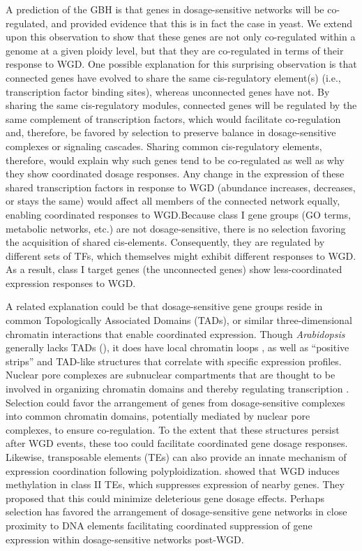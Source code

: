 \documentclass[11pt]{article}
\begin{document}
A prediction of the GBH is that genes in dosage-sensitive networks will be co-regulated, and \cite{papp2003} provided evidence that this is in fact the case in yeast. We extend upon this observation to show that these genes are not only co-regulated within a genome at a given ploidy level, but that they are co-regulated in terms of their response to WGD. 
One possible explanation for this surprising observation is that connected genes have evolved to share the same cis-regulatory element(s) (i.e., transcription factor binding sites), whereas unconnected genes have not. By sharing the same cis-regulatory modules, connected genes will be regulated by the same complement of transcription factors, which would facilitate co-regulation and, therefore, be favored by selection to preserve balance in dosage-sensitive complexes or signaling cascades. Sharing common cis-regulatory elements, therefore, would explain why such genes tend to be co-regulated as well as why they show coordinated dosage responses. Any change in the expression of these shared transcription factors in response to WGD (abundance increases, decreases, or stays the same) would affect all members of the connected network equally, enabling coordinated responses to WGD.Because class I gene groups (GO terms, metabolic networks, etc.) are not dosage-sensitive, there is no selection favoring the acquisition of shared cis-elements. Consequently, they are regulated by different sets of TFs, which themselves might exhibit different responses to WGD. As a result, class I target genes (the unconnected genes) show less-coordinated expression responses to WGD.

A related explanation could be that dosage-sensitive gene groups reside in common Topologically Associated Domains (TADs), or similar three-dimensional chromatin interactions that enable coordinated expression. Though {\it Arabidopsis} generally lacks TADs (\citep{liu2017}), it does have local chromatin loops \citep{liu2017}, as well as ``positive strips'' and TAD-like structures \citep{wang2016} that correlate with specific expression profiles. Nuclear pore complexes are subnuclear compartments that are thought to be involved in organizing chromatin domains and thereby regulating transcription \citep{sun2019}. Selection could favor the arrangement of genes from dosage-sensitive complexes into common chromatin domains, potentially mediated by nuclear pore complexes, to ensure co-regulation. To the extent that these structures persist after WGD events, these too could facilitate coordinated gene dosage responses. Likewise, transposable elements (TEs) can also provide an innate mechanism of expression coordination following polyploidization. \citep{zhang2015} showed that WGD induces methylation in class II TEs, which suppresses expression of nearby genes. They proposed that this could minimize deleterious gene dosage effects. Perhaps selection has favored the arrangement of dosage-sensitive gene networks in close proximity to DNA elements facilitating coordinated suppression of gene expression within dosage-sensitive networks post-WGD.
\end{document}
